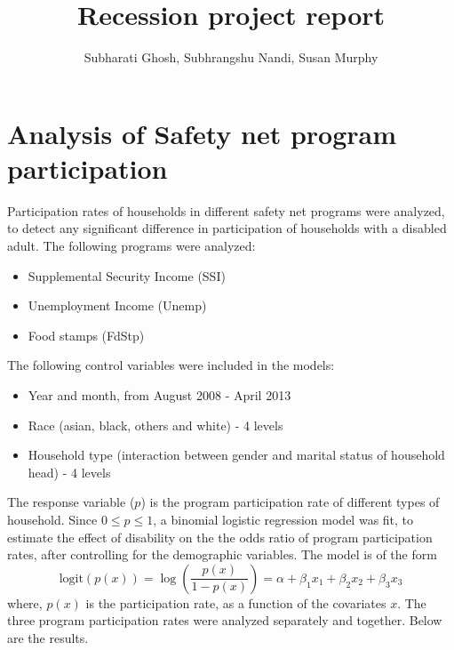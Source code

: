 \documentclass[11pt]{extarticle} %
\begin{document}

\title{Recession project report}
\author{Subharati Ghosh, Subhrangshu Nandi, Susan Murphy \\
\date{}
}

\maketitle

\section{Analysis of Safety net program participation}
Participation rates of households in different safety net programs were analyzed, to detect any significant difference in participation of households with a disabled adult. The following programs were analyzed:
\begin{itemize}
\item Supplemental Security Income (SSI)
\item Unemployment Income (Unemp)
\item Food stamps (FdStp)
\end{itemize}

The following control variables were included in the models:
\begin{itemize}
\item Year and month, from August 2008 - April 2013
\item Race (asian, black, others and white) - 4 levels
\item Household type (interaction between gender and marital status of household head) - 4 levels
\end{itemize}

The response variable ($p$) is the program participation rate of different types of household. Since $0 \leq p \leq 1$, a binomial logistic regression model was fit, to estimate the effect of disability on the the odds ratio of program participation rates, after controlling for the demographic variables. The model is of the form
\[ \text{logit}(p(x)) = \log\left(\frac{p(x)}{1 - p(x)}\right) = \alpha + \beta_1 x_1 + \beta_2 x_2 + \beta_3 x_3  \]
where, $p(x)$ is the participation rate, as a function of the covariates $x$. The three program participation rates were analyzed separately and together. Below are the results.
\end{document}
